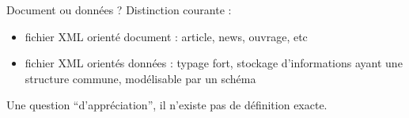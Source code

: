 \begin{frame}[allowframebreaks]{Document ou données ?}
Distinction courante :
\begin{itemize}
\item fichier XML orienté document : article, news, ouvrage, etc
\item fichier XML orientés données : typage fort, stockage d'informations ayant une structure commune, modélisable par un schéma
\end{itemize}
Une question ``d'appréciation'', il n'existe pas de définition exacte.


\framebreak



\framebreak


\end{frame}



